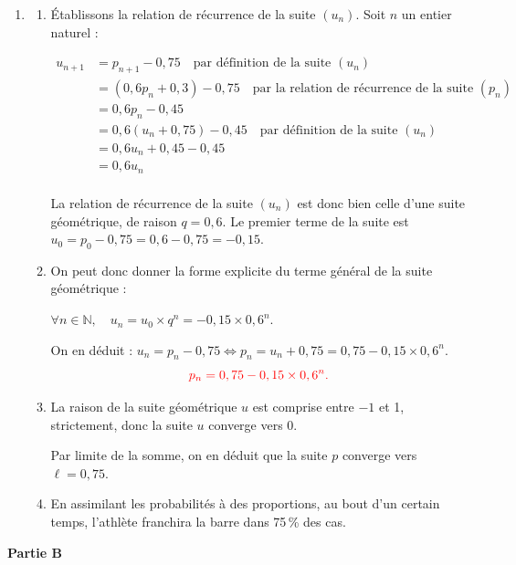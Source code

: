 \documentclass[10pt]{article}
\providecommand{\red}{\color{red}}
\providecommand{\N}{\mathbb{N}}
\providecommand{\red}{\color{red}}
\begin{document}
\begin{enumerate}
Donc on a bien $p_{n+1} = 0,6p_n + 0,3$ : on a donc bien établi la relation de récurrence annoncée.

\item
\begin{enumerate}
\item  Établissons la relation de récurrence de la suite $(u_n)$. Soit $n$ un entier naturel :

$\begin{aligned} u_{n+1} &= p_{n+1} - 0,75 \quad \text{par définition de la suite } (u_n)\\
				&= (0,6p_n + 0,3) - 0,75 \quad \text{par la relation de récurrence de la suite } (p_n)\\
				&= 0,6p_n - 0,45\\
				&= 0,6(u_n + 0,75)-0,45\quad \text{par définition de la suite } (u_n)\\
				&=0,6u_n+0,45-0,45\\
				&= 0,6u_n \\ \end{aligned}$

				La relation de récurrence de la suite $(u_n)$ est donc bien celle d'une suite géométrique, de raison $q = 0,6$. Le premier terme de la suite est $u_0 = p_0 - 0,75 = 0,6 - 0,75 = - 0,15$.
\item On peut donc donner la forme explicite du terme général de la suite géométrique :

$\forall n \in \N, \quad u_n = u_0 \times q^n = -0,15\times 0,6^n$.

On en déduit : $u_n = p_n - 0,75 \iff p_n = u_n + 0,75 = 0,75 - 0,15\times 0,6^n.$
\[\red p_n = 0,75 - 0,15\times 0,6^n.\]
\item La raison de la suite géométrique $u$ est comprise entre $-1$ et 1, strictement, donc la suite $u$ converge vers 0.

Par limite de la somme, on en déduit que la suite $p$ converge vers $\ell=0,75$.
\item En assimilant les probabilités à des proportions,  au bout d'un certain temps,  l'athlète franchira la barre  dans 75\,\% des cas.
\end{enumerate}

\end{enumerate}

\textbf{Partie B}
\end{document}
